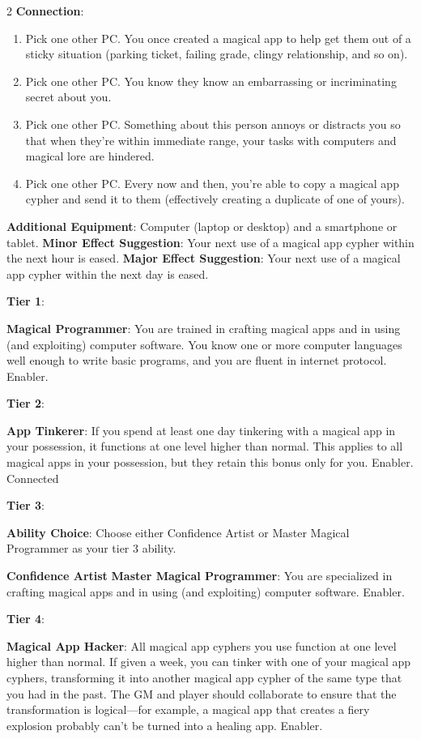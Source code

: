 \begin{multicols}{2}
\textbf{Connection}:

\begin{enumerate}
\item Pick one other PC. You once created a magical app to help get them out of a sticky situation (parking ticket, failing grade, clingy relationship, and so on).
\item Pick one other PC. You know they know an embarrassing or incriminating secret about you.
\item Pick one other PC. Something about this person annoys or distracts you so that when they’re within immediate range, your tasks with computers and magical lore are hindered.
\item Pick one other PC. Every now and then, you’re able to copy a magical app cypher and send it to them (effectively creating a duplicate of one of yours).
\end{enumerate}

\textbf{Additional Equipment}: Computer (laptop or desktop) and a smartphone or tablet. 
\textbf{Minor Effect Suggestion}: Your next use of a magical app cypher within the next hour is eased.
\textbf{Major Effect Suggestion}: Your next use of a magical app cypher within the next day is eased.

\textbf{Tier 1}:

\textbf{Magical Programmer}: You are trained in crafting magical apps and in using (and exploiting) computer software. You know one or more computer languages well enough to write basic programs, and you are fluent in internet protocol. Enabler.

\textbf{Tier 2}:

\textbf{App Tinkerer}: If you spend at least one day tinkering with a magical app in your possession, it functions at one level higher than normal. This applies to all magical apps in your possession, but they retain this bonus only for you. Enabler.
Connected

\textbf{Tier 3}:

\textbf{Ability Choice}: Choose either Confidence Artist or Master Magical Programmer as your tier 3 ability.

\textbf{Confidence Artist} 
\textbf{Master Magical Programmer}: You are specialized in crafting magical apps and in using (and exploiting) computer software. Enabler.

\textbf{Tier 4}:

\textbf{Magical App Hacker}: All magical app cyphers you use function at one level higher than normal. If given a week, you can tinker with one of your magical app cyphers, transforming it into another magical app cypher of the same type that you had in the past. The GM and player should collaborate to ensure that the transformation is logical—for example, a magical app that creates a fiery explosion probably can’t be turned into a healing app. Enabler.


\end{multicols}
